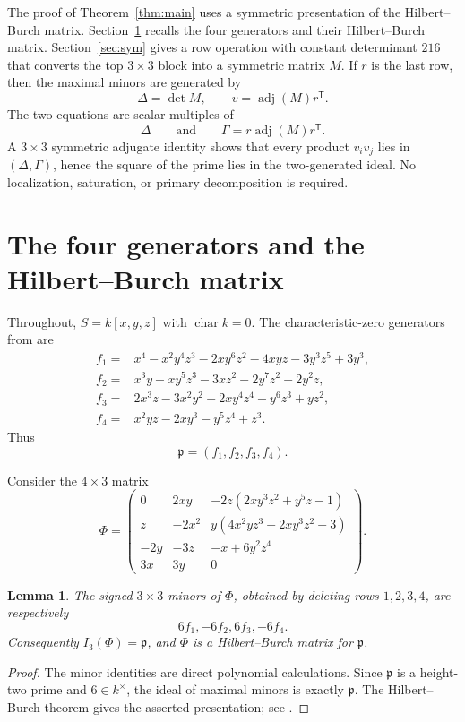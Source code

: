 \documentclass[11pt]{amsart}
\newtheorem{lemma}[theorem]{Lemma}
\theoremstyle{remark}
\DeclareMathOperator{\adj}{adj}
\begin{document}
The proof of Theorem~\ref{thm:main} uses a symmetric presentation of the Hilbert--Burch matrix.  Section~\ref{sec:HB} recalls the four generators and their Hilbert--Burch matrix.  Section~\ref{sec:sym} gives a row operation with constant determinant $216$ that converts the top $3\times3$ block into a symmetric matrix $M$.  If $r$ is the last row, then the maximal minors are generated by
\[
 \Delta=\det M,\qquad v=\adj(M)r^{\mathsf T}.
\]
The two equations are scalar multiples of
\[
 \Delta\qquad\text{and}\qquad \Gamma=r\adj(M)r^{\mathsf T}.
\]
A $3\times3$ symmetric adjugate identity shows that every product $v_iv_j$ lies in $(\Delta,\Gamma)$, hence the square of the prime lies in the two-generated ideal.  No localization, saturation, or primary decomposition is required.

\section{The four generators and the Hilbert--Burch matrix}\label{sec:HB}
Throughout, $S=k[x,y,z]$ with $\operatorname{char}k=0$.  The characteristic-zero generators from \cite{GonzalezPlanas2026} are
\begin{align*}
 f_1={}&x^4-x^2y^4z^3-2xy^6z^2-4xyz-3y^3z^5+3y^3,\\
 f_2={}&x^3y-xy^5z^3-3xz^2-2y^7z^2+2y^2z,\\
 f_3={}&2x^3z-3x^2y^2-2xy^4z^4-y^6z^3+yz^2,\\
 f_4={}&x^2yz-2xy^3-y^5z^4+z^3.
\end{align*}
Thus
\[
 \mathfrak p=(f_1,f_2,f_3,f_4).
\]

Consider the $4\times3$ matrix
\[
\Phi=
\begin{pmatrix}
0&2xy&-2z(2xy^3z^2+y^5z-1)\\
z&-2x^2&y(4x^2yz^3+2xy^3z^2-3)\\
-2y&-3z&-x+6y^2z^4\\
3x&3y&0
\end{pmatrix}.
\]

\begin{lemma}\label{lem:HB}
The signed $3\times3$ minors of $\Phi$, obtained by deleting rows $1,2,3,4$, are respectively
\[
 6f_1,-6f_2,6f_3,-6f_4.
\]
Consequently $I_3(\Phi)=\mathfrak p$, and $\Phi$ is a Hilbert--Burch matrix for $\mathfrak p$.
\end{lemma}

\begin{proof}
The minor identities are direct polynomial calculations.  Since $\mathfrak p$ is a height-two prime and $6\in k^\times$, the ideal of maximal minors is exactly $\mathfrak p$.  The Hilbert--Burch theorem gives the asserted presentation; see \cite[Theorem 20.15]{Eisenbud1995}.
\end{proof}
\end{document}
